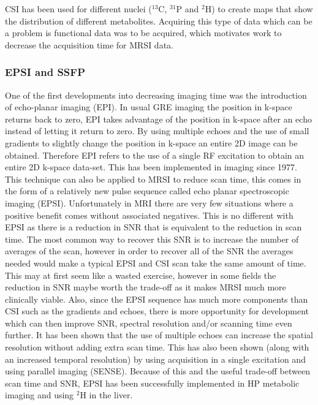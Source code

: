 \documentclass[class=article, crop=false]{standalone}
\begin{document}
CSI has been used for different nuclei ($^{13}$C, $^{31}$P and $^2$H) to create maps that show the distribution of different metabolites. Acquiring this type of data which can be a problem is functional data was to be acquired, which motivates work to decrease the acquisition time for MRSI data.

\subsubsection{EPSI and SSFP}

One of the first developments into decreasing imaging time was the introduction of echo-planar imaging (EPI). In usual GRE imaging the position in k-space returns back to zero, EPI takes advantage of the position in k-space after an echo instead of letting it return to zero. By using multiple echoes and the use of small gradients to slightly change the position in k-space an entire 2D image can be obtained. Therefore EPI refers to the use of a single RF excitation to obtain an entire 2D k-space data-set. This has been implemented in imaging since 1977\cite{Mansfield1977Multi-planarEchoes}. This technique can also be applied to MRSI to reduce scan time, this comes in the form of a relatively new pulse sequence called echo planar spectroscopic imaging (EPSI)\cite{Mulkern2001EchoImaging}. Unfortunately in MRI there are very few situations where a positive benefit comes without associated negatives. This is no different with EPSI as there is a reduction in SNR that is equivalent to the reduction in scan time. The most common way to recover this SNR is to increase the number of averages of the scan, however in order to recover all of the SNR the averages needed would make a typical EPSI and CSI scan take the same amount of time\cite{Mulkern2001EchoImaging}. This may at first seem like a wasted exercise, however in some fields the reduction in SNR maybe worth the trade-off as it makes MRSI much more clinically viable. Also, since the EPSI sequence has much more components than CSI such as the gradients and echoes, there is more opportunity for development which can then improve SNR, spectral resolution and/or scanning time even further. It has been shown that the use of multiple echoes can increase the spatial resolution without adding extra scan time\cite{Furuyama2011Multi-echo-basedScanner}. This has also been shown (along with an increased temporal resolution) by using acquisition in a single excitation and using parallel imaging (SENSE)\cite{Posse2009Single-shotImaging}. Because of this and the useful trade-off between scan time and SNR, EPSI has been successfully implemented in HP metabolic imaging\cite{Topping2020AcquisitionNuclei,Eldirdiri2018DevelopmentScanner} and using $^2$H in the liver\cite{Min2023Deuterium7T}.
\end{document}
